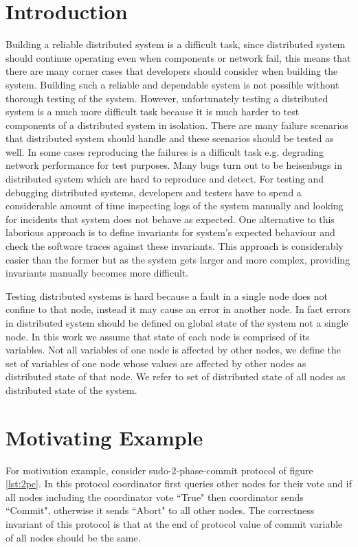 \section{Introduction}

Building a reliable distributed system is a difficult task, since distributed system should continue operating even when components or network fail, this means that there are many corner cases that developers should consider when building the system. Building such 
a reliable and dependable system is not possible without thorough testing of the system. However, unfortunately testing a distributed system is a much more difficult task because it is much harder to test components of a distributed system in isolation. There are many 
failure scenarios that distributed system should handle and these scenarios should be tested as well. In some cases reproducing the failures is a difficult task e.g. degrading network performance for test purposes. Many bugs turn out to be heisenbugs in distributed 
system which are hard to reproduce and detect. For testing and debugging distributed systems, developers and testers have to spend a considerable amount of time inspecting logs of the system manually and looking for incidents that system does not behave as 
expected. One alternative to this laborious approach is to define invariants for system's expected behaviour and check the software traces against these invariants. This approach is considerably easier than the former but as the system gets larger and more 
complex, providing invariants manually becomes more difficult.

Testing distributed systems is hard because a fault in a single node does not confine to that node, instead it may cause an error in another node. In fact errors in distributed system should be defined on global state of the system not a single node. In this work we 
assume that state of each node is comprised of its variables. Not all variables of one node is affected by other nodes, we define the set of variables of one node whose values are affected by other nodes as distributed state of that node. We refer to set of distributed 
state of all nodes as distributed state of the system.


\section{Motivating Example}
For motivation example, consider sudo-2-phase-commit protocol of figure \ref{lst:2pc}. In this protocol coordinator first queries other nodes for their vote and if all nodes including the coordinator vote ``True" then coordinator sends ``Commit", otherwise it sends ``Abort" to all other nodes. The correctness invariant of this protocol is that at the end of protocol value of commit variable of all nodes should be the same.


